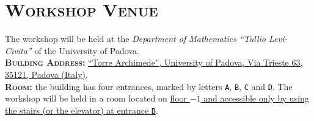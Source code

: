 \documentclass{article}
\begin{document}
\newpage
\section*{\centering \textsc{Workshop Venue}}

\noindent The workshop will be held at the \textit{Department of Mathematics ``Tullio Levi-Civita''} of the University of Padova.\\

\noindent \textbf{\textsc{Building Address:}} \href{https://www.google.com/maps/place/Torre+Archimede,+Via+Trieste,+63,+35121+Padova+PD/@45.4113787,11.8848977,901m/data=!3m2!1e3!4b1!4m6!3m5!1s0x477eda58b44676df:0xfacae5884fca17f5!8m2!3d45.4113787!4d11.8874726!16s\%2Fg\%2F12xqbl_z1?entry=ttu&g_ep=EgoyMDI0MTAwOC4wIKXMDSoASAFQAw\%3D\%3D}{``Torre Archimede'', University of Padova, Via Trieste 63, 35121, Padova (Italy)}.\\

\noindent \textbf{\textsc{Room:}} the building has four entrances, marked by letters \texttt{A}, \texttt{B}, \texttt{C} and \texttt{D}.
The workshop will be held in a room located on \underline{floor $-1$ and accessible only by using the stairs (or the elevator) at entrance \texttt{B}}.
\end{document}
